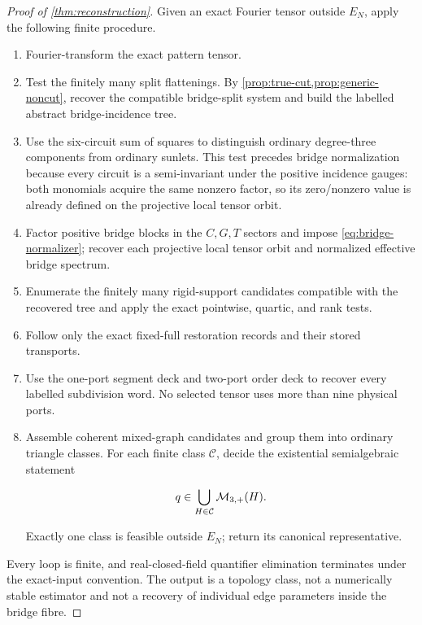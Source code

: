 \begin{proof}[Proof of \cref{thm:reconstruction}]
Given an exact Fourier tensor outside \(E_N\), apply the following finite
procedure.

\begin{enumerate}[label=\textbf{R\arabic*.}]
  \item Fourier-transform the exact pattern tensor.
  \item Test the finitely many split flattenings.  By
        \cref{prop:true-cut,prop:generic-noncut}, recover the compatible
        bridge-split system and build the labelled abstract bridge-incidence
        tree.
  \item Use the six-circuit sum of squares to distinguish ordinary
        degree-three components from ordinary sunlets.  This test precedes
        bridge normalization because every circuit is a semi-invariant under
        the positive incidence gauges: both monomials acquire the same
        nonzero factor, so its zero/nonzero value is already defined on the
        projective local tensor orbit.
  \item Factor positive bridge blocks in the \(C,G,T\) sectors and impose
        \eqref{eq:bridge-normalizer}; recover each projective local tensor
        orbit and normalized effective bridge spectrum.
  \item Enumerate the finitely many rigid-support candidates compatible with
        the recovered tree and apply the exact pointwise, quartic, and rank
        tests.
  \item Follow only the exact fixed-full restoration records and their stored
        transports.
  \item Use the one-port segment deck and two-port order deck to recover every
        labelled subdivision word.  No selected tensor uses more than nine
        physical ports.
  \item Assemble coherent mixed-graph candidates and group them into ordinary
        triangle classes.  For each finite class \(\mathcal C\), decide the
        existential semialgebraic statement

        \[
          q\in\bigcup_{H\in\mathcal C}\mathcal M_{3,+}(H).
        \]

        Exactly one class is feasible outside \(E_N\); return its canonical
        representative.
\end{enumerate}

Every loop is finite, and real-closed-field quantifier elimination terminates
under the exact-input convention.  The output is a topology class, not a
numerically stable estimator and not a recovery of individual edge parameters
inside the bridge fibre.
\end{proof}
